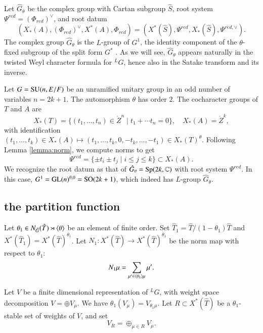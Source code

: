 Let $\hat G_\theta$ be the complex group with Cartan subgroup $\hat
S$, root system $\Psi^{red}=(\Phi_{red})^\vee$, and root datum
\[
(X_*(A),(\Phi_{red})^\vee,X^*(A),\Phi_{red}) 
= (X^*(\hat S),\Psi^{red},X_*(\hat S),\Psi^{red,\vee}).
\]
The complex group $\hat G_\theta$ is the $L$-group of $G^1$, the
identity component of the $\theta$-fixed subgroup of the split form
$G^*$ \cite[\S1.3]{kottwitz1999foundations}.  As we will see, $\hat
G_\theta$ appears naturally in the twisted Weyl character formula for
${}^LG$, hence also in the Satake transform and its inverse.

\begin{example} Let $G={\operatorname{SU}}(n,E/F)$ be an unramified unitary group
  in an odd number of variables $n=2k+1$.  The automorphism $\theta$
  has order $2$.  The cocharacter groups of $T$ and $A$ are
\[
X_*(T) = \{(t_1,\ldots,t_{n})\in \ring{Z}^n\mid t_1+\cdots t_n=0\}, 
\quad
X_*(A)  = \ring{Z}^k,
\]
with identification $(t_1,\ldots,t_k)\in X_*(A)\mapsto
(t_1,\ldots,t_k,0,-t_k,\ldots,-t_1)\in X_*(T)^\theta$.  Following
Lemma \ref{lemma:norm}, we compute norms to get
\[
\Psi^{red} = \{\pm t_i\pm t_j\mid i\le j\le k\}\subset X_*(A).
\]
We recognize the root datum as that of $\hat G_\theta =
{\operatorname{Sp}}(2k,\mathbb{C})$ with root system $\Psi^{red}$.  In this case, $G^1
= {\operatorname{GL}}(n)^{\theta,0} = {\operatorname{SO}}(2k+1)$, which indeed has $L$-group
$\hat G_\theta$.
\end{example}


\subsection{the partition function}

Let $\theta_1\in N_{\hat G}(\hat T) \rtimes \langle{\theta}\rangle$ be an
element of finite order.  Set $\hat T_1 = \hat T/(1-\theta_1)\hat T$
and $X^*(\hat T_1) = X^*(\hat T)^{\theta_1}$.  Let $N_1:X^*(\hat T)\to
X^*(\hat T)^{\theta_1}$ be the norm map with respect to $\theta_1$:
\[
N_1 \mu = \sum_{\mu'\in \langle{\theta_1}\rangle\mu} \mu'.
\]

Let $V$ be a finite dimensional representation of ${}^LG$, with
weight space decomposition 
$V=\oplus V_\mu$.  We have
$\theta_1(V_\mu) = V_{\theta_1\mu}$.  Let $R\subset X^*(\hat T)$ be a
$\theta_1$-stable set of weights of $V$, and set
\begin{equation}\label{eqn:VR}
V_R = \oplus_{\mu\in R} V_\mu.
\end{equation}

